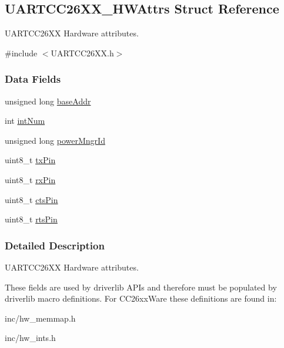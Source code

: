 \subsection{U\-A\-R\-T\-C\-C26\-X\-X\-\_\-\-H\-W\-Attrs Struct Reference}
\label{struct_u_a_r_t_c_c26_x_x___h_w_attrs}


U\-A\-R\-T\-C\-C26\-X\-X Hardware attributes.  




{\ttfamily \#include $<$U\-A\-R\-T\-C\-C26\-X\-X.\-h$>$}

\subsubsection*{Data Fields}
\begin{DoxyCompactItemize}
\item 
unsigned long \hyperlink{struct_u_a_r_t_c_c26_x_x___h_w_attrs_ac185811e7492b19d0682b229ae762291}{base\-Addr}
\item 
int \hyperlink{struct_u_a_r_t_c_c26_x_x___h_w_attrs_ab16717e96a640f0908f868e48624d3dd}{int\-Num}
\item 
unsigned long \hyperlink{struct_u_a_r_t_c_c26_x_x___h_w_attrs_a5b493ef28f69eb5afabdd308f15c8992}{power\-Mngr\-Id}
\item 
uint8\-\_\-t \hyperlink{struct_u_a_r_t_c_c26_x_x___h_w_attrs_abe8dcea54ebbdebdaae1504908a96b95}{tx\-Pin}
\item 
uint8\-\_\-t \hyperlink{struct_u_a_r_t_c_c26_x_x___h_w_attrs_a45fd697b8735c682ce7d12af6348d229}{rx\-Pin}
\item 
uint8\-\_\-t \hyperlink{struct_u_a_r_t_c_c26_x_x___h_w_attrs_a03d0531a1fdcf84206163376c6eefaba}{cts\-Pin}
\item 
uint8\-\_\-t \hyperlink{struct_u_a_r_t_c_c26_x_x___h_w_attrs_a1a9efb86deefbf00c440787513fc8d96}{rts\-Pin}
\end{DoxyCompactItemize}


\subsubsection{Detailed Description}
U\-A\-R\-T\-C\-C26\-X\-X Hardware attributes. 

These fields are used by driverlib A\-P\-Is and therefore must be populated by driverlib macro definitions. For C\-C26xx\-Ware these definitions are found in\-:
\begin{DoxyItemize}
\item inc/hw\-\_\-memmap.\-h
\item inc/hw\-\_\-ints.\-h
\end{DoxyItemize}

